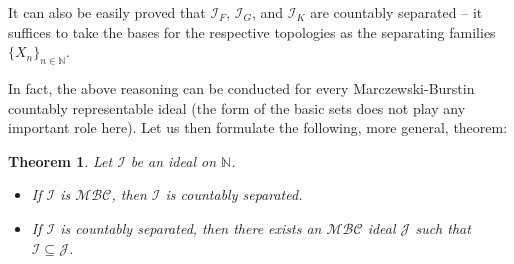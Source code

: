 \documentclass{amsart}
\newtheorem{thm}{Theorem}[section]
\theoremstyle{definition}
\newtheorem{remark}[thm]{Remark}
\theoremstyle{definition}
\newcommand{\N}{{\mathbb N}}
\newcommand{\I}{\mathcal I}
\newcommand{\J}{\mathcal J}
\newcommand{\MBC}{\mathcal{MBC}}
\begin{document}
It can also be easily proved that $\I_F$, $\I_G$, and $\I_K$ are countably separated -- it suffices to take the bases for the respective topologies as the separating families $\{X_n\}_{n\in\N}$.

In fact, the above reasoning can be conducted for every Marczewski-Burstin countably representable 
ideal (the form of the basic sets does not play any important role here). Let us then formulate the following, more general, theorem:
\begin{thm}
Let $\I$ be an ideal on $\N$.
\begin{itemize}
\item[$(i)$] If $\I$ is $\MBC$, then $\I$ is countably separated.
\item[$(ii)$] If $\I$ is countably separated, then there exists an $\MBC$ ideal $\J$ such that $\I \subseteq \J$.
\end{itemize}
\end{thm}
\end{document}
